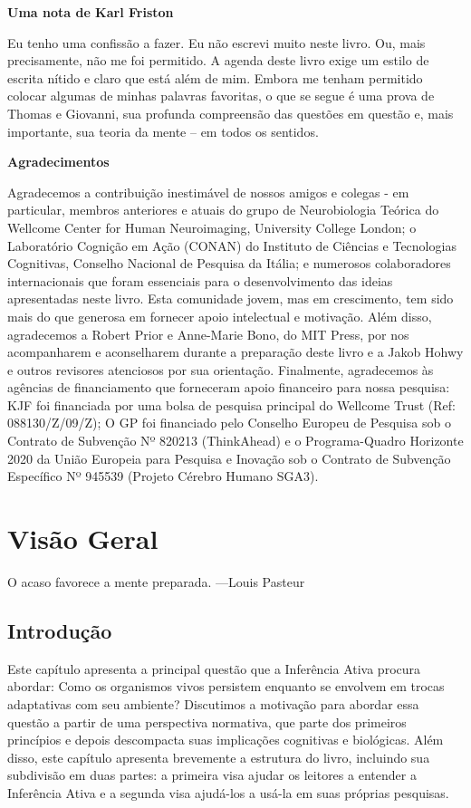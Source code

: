 \documentclass[
  12pt,
]{book}
\begin{document}
\textbf{Uma nota de Karl Friston}

Eu tenho uma confissão a fazer. Eu não escrevi muito neste livro. Ou, mais precisamente, não me foi permitido. A agenda deste livro exige um estilo de escrita nítido e claro que está além de mim. Embora me tenham permitido colocar algumas de minhas palavras favoritas, o que se segue é uma prova de Thomas e Giovanni, sua profunda compreensão das questões em questão e, mais importante, sua teoria da mente -- em todos os sentidos.

\textbf{Agradecimentos}

Agradecemos a contribuição inestimável de nossos amigos e colegas - em particular, membros anteriores e atuais do grupo de Neurobiologia Teórica do Wellcome Center for Human Neuroimaging, University College London; o Laboratório Cognição em Ação (CONAN) do Instituto de Ciências e Tecnologias Cognitivas, Conselho Nacional de Pesquisa da Itália; e numerosos colaboradores internacionais que foram essenciais para o desenvolvimento das ideias apresentadas neste livro. Esta comunidade jovem, mas em crescimento, tem sido mais do que generosa em fornecer apoio intelectual e motivação. Além disso, agradecemos a Robert Prior e Anne-Marie Bono, do MIT Press, por nos acompanharem e aconselharem durante a preparação deste livro e a Jakob Hohwy e outros revisores atenciosos por sua orientação. Finalmente, agradecemos às agências de financiamento que forneceram apoio financeiro para nossa pesquisa: KJF foi financiada por uma bolsa de pesquisa principal do Wellcome Trust (Ref: 088130/Z/09/Z); O GP foi financiado pelo Conselho Europeu de Pesquisa sob o Contrato de Subvenção Nº 820213 (ThinkAhead) e o Programa-Quadro Horizonte 2020 da União Europeia para Pesquisa e Inovação sob o Contrato de Subvenção Específico Nº 945539 (Projeto Cérebro Humano SGA3).

\hypertarget{visuxe3o-geral}{%
\chapter{Visão Geral}\label{visuxe3o-geral}}

O acaso favorece a mente preparada.
---Louis Pasteur

\hypertarget{introduuxe7uxe3o}{%
\section{Introdução}\label{introduuxe7uxe3o}}

Este capítulo apresenta a principal questão que a Inferência Ativa procura abordar: Como os organismos vivos persistem enquanto se envolvem em trocas adaptativas com seu ambiente? Discutimos a motivação para abordar essa questão a partir de uma perspectiva normativa, que parte dos primeiros princípios e depois descompacta suas implicações cognitivas e biológicas. Além disso, este capítulo apresenta brevemente a estrutura do livro, incluindo sua subdivisão em duas partes: a primeira visa ajudar os leitores a entender a Inferência Ativa e a segunda visa ajudá-los a usá-la em suas próprias pesquisas.
\end{document}
